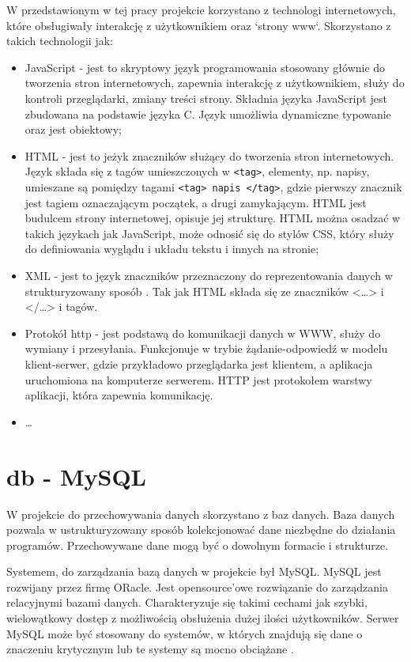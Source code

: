 \documentclass[eng,printmode,oneside]{mgr}
\begin{document}
W przedstawionym w tej pracy projekcie korzystano z technologi internetowych,
które obsługiwały interakcję z użytkownikiem oraz `strony www`. Skorzystano
z takich technologii jak:
\begin{itemize}
  \item JavaScript - jest to skryptowy język programowania stosowany głównie do
  tworzenia stron internetowych, zapewnia interakcję z
  użytkownikiem\cite{javascript.wiki}, służy do kontroli przeglądarki, zmiany
  treści strony. Składnia języka JavaScript jest zbudowana na podstawie języka
  C. Język umożliwia dynamiczne typowanie oraz jest obiektowy;
  \item HTML - jest to jeżyk znaczników służący do tworzenia stron
  internetowych. Język składa się z tagów umieszczonych w \texttt{<tag>},
  elementy, np. napisy, umieszane są pomiędzy tagami \texttt{<tag> napis
  </tag>}, gdzie pierwszy znacznik jest tagiem oznaczającym początek, a drugi
  zamykającym. HTML jest budulcem strony internetowej, opisuje jej strukturę.
  HTML można osadzać w takich językach jak JavaScript, może odnosić się do
  stylów CSS, który służy do definiowania wyglądu i układu tekstu i innych na
  stronie;
  \item XML - jest to język znaczników przeznaczony do reprezentowania danych w
  strukturyzowany sposób \cite{xml.wiki}. Tak jak HTML składa się ze znaczników
  <\ldots> i </\ldots> i tagów.
  \item Protokół http - jest podstawą do komunikacji danych w WWW, służy do
  wymiany i przesyłania. Funkcjonuje w trybie żądanie-odpowiedź w
  modelu klient-serwer, gdzie przykładowo przeglądarka jest klientem, a
  aplikacja uruchomiona na komputerze serwerem. HTTP jest protokołem warstwy
  aplikacji, która zapewnia komunikację.
  \item \ldots
\end{itemize}

\newpage
\section{db - MySQL}

W projekcie do przechowywania danych skorzystano z baz danych. Baza danych
pozwala w ustrukturyzowany sposób kolekcjonować dane niezbędne do działania
programów. Przechowywane dane mogą być o dowolnym formacie i strukturze.

Systemem, do zarządzania bazą danych w projekcie był MySQL. MySQL jest
rozwijany przez firmę ORacle. Jest opensource'owe rozwiązanie do zarządzania
relacyjnymi bazami danych. Charakteryzuje się takimi cechami jak szybki,
wielowątkowy dostęp z możliwością obsłużenia dużej ilości użytkowników. Serwer
MySQL może być stosowany do systemów, w których znajdują się dane o znaczeniu
krytycznym lub te systemy są mocno obciążane \cite{Mysql.com}. 
\end{document}
